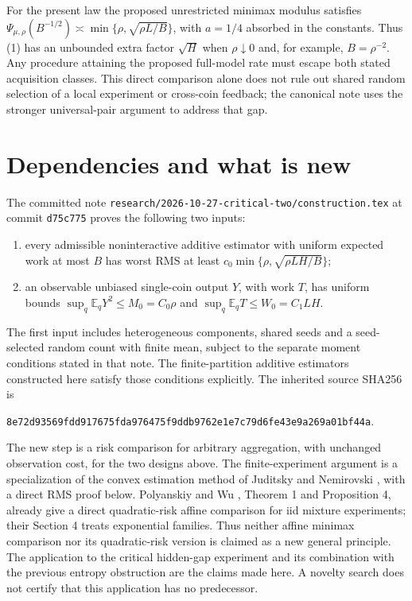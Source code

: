 \documentclass[11pt]{article}
\newcommand{\E}{\mathbb E}
\begin{document}
For the present law the proposed unrestricted minimax modulus satisfies
$\Psi_{\mu,\rho}(B^{-1/2})\asymp
\min\{\rho,\sqrt{\rho L/B}\}$, with $a=1/4$ absorbed in the constants.
Thus (1) has an unbounded extra factor $\sqrt H$ when $\rho\downarrow0$
and, for example, $B=\rho^{-2}$. Any procedure attaining the proposed
full-model rate must escape both stated acquisition classes. This direct
comparison alone does not rule out shared random selection of a local
experiment or cross-coin feedback; the canonical note uses the stronger
universal-pair argument to address that gap.

\section{Dependencies and what is new}
The committed note \texttt{research/2026-10-27-critical-two/construction.tex}
at commit \texttt{d75c775} proves the following two inputs:
\begin{enumerate}
\item every admissible noninteractive additive estimator with uniform
expected work at most $B$ has worst RMS at least
$c_0\min\{\rho,\sqrt{\rho LH/B}\}$;
\item an observable unbiased single-coin output $Y$, with work $T$, has
uniform bounds $\sup_q\E_qY^2\le M_0=C_0\rho$ and
$\sup_q\E_qT\le W_0=C_1LH$.
\end{enumerate}
The first input includes heterogeneous components, shared seeds and a
seed-selected random count with finite mean, subject to the separate moment
conditions stated in that note. The finite-partition additive estimators
constructed here satisfy those conditions explicitly. The inherited source
SHA256 is
\begin{center}\small\texttt{8e72d93569fdd917675fda976475f9ddb9762e1e7c79d6fe43e9a269a01bf44a}.\end{center}

The new step is a risk comparison for arbitrary aggregation, with unchanged
observation cost, for the two designs above. The finite-experiment argument
is a specialization of the convex estimation method of Juditsky and
Nemirovski \cite{JN}, with a direct RMS proof below. Polyanskiy and Wu
\cite{PW}, Theorem 1 and Proposition 4, already give a direct quadratic-risk
affine comparison for iid mixture experiments; their Section 4 treats
exponential families. Thus neither affine minimax comparison nor its
quadratic-risk version is claimed as a new general principle. The application to
the critical hidden-gap experiment and its combination with the previous
entropy obstruction are the claims made here. A novelty search does not
certify that this application has no predecessor.
\end{document}
